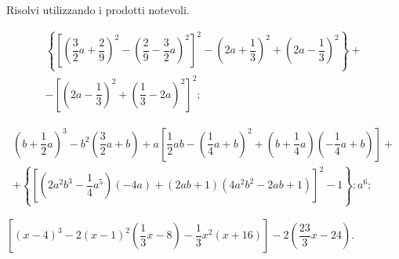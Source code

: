 \begin{esercizio}[\Ast]
 \label{ese:12.39}
Risolvi utilizzando i prodotti notevoli.
 \begin{enumeratea}
 \item \begin{multline*} \left\lbrace\left[\left(\dfrac{3}{2}a+\dfrac{2}{9}\right)^{2}-\left(\dfrac{2}{9}-\dfrac{3}{2}a\right)^{2}\right]^{2}-\left(2a+\dfrac{1}{3}\right)^{2}+\left(2a-\dfrac{1}{3}\right)^{2}\right\rbrace+\\-\left[\left(2a-\dfrac{1}{3}\right)^{2}+\left(\dfrac{1}{3}-2a\right)^{2}\right]^{2};\end{multline*}
 \item \begin{multline*} \left(b+\dfrac{1}{2}a\right)^{3}-b^{2}\left(\dfrac{3}{2}a+b\right)+a\left[\dfrac{1}{2}ab-\left(\dfrac{1}{4}a+b\right)^{2}+\left(b+\dfrac{1}{4}a\right)\left(-\dfrac{1}{4}a+b\right)\right]+\\+\left\lbrace\left[\left(2a^{2}b^{3}-\dfrac{1}{4}a^{5}\right)(-4a)+(2ab+1)\left(4a^{2}b^{2}-2ab+1\right)\right]^{2}-1\right\rbrace:a^{6};\end{multline*}
 \item $\left[(x-4)^{3}-2(x-1)^{2}\left(\dfrac{1}{3}x-8\right)-\dfrac{1}{3}x^{2}(x+16)\right]-2\left(\dfrac{23}{3}x-24\right)$.
 \end{enumeratea}
\end{esercizio}

